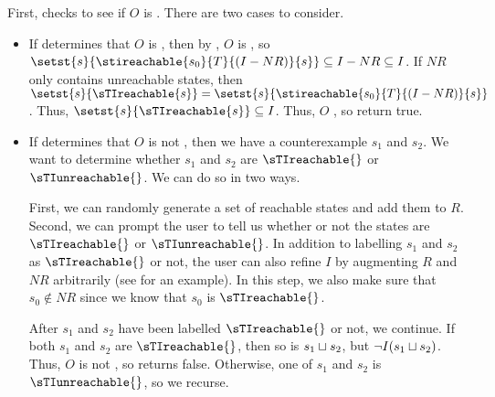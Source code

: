 First, \Helper{} checks to see if $O$ is . There are two
cases to consider.
\begin{itemize}
  \item
    If \IsIclosed{} determines that $O$ is , then by
    , $O$ is , so
    $
      \setst{s}{\stireachable{s_0}{T}{(I-NR)}{s}}
        \subseteq I - NR
        \subseteq I
    $.
    If $NR$ only contains unreachable states, then
    $
      \setst{s}{\sTIreachable{s}} = \setst{s}{\stireachable{s_0}{T}{(I-NR)}{s}}
    $.
    Thus,
    $
      \setst{s}{\sTIreachable{s}} \subseteq I
    $.
    Thus, $O$ \sTIconfluent{}, so \Helper{} return true.

  \item
    If \IsIclosed{} determines that $O$ is not , then we
    have a counterexample $s_1$ and $s_2$. We want to determine whether $s_1$
    and $s_2$ are $\sTIreachable{}$ or $\sTIunreachable{}$. We can do so in two
    ways.

    First, we can randomly generate a set of reachable states and add them to
    $R$.
    Second, we can prompt the user to tell us whether or not the states are
    $\sTIreachable{}$ or $\sTIunreachable{}$. In addition to labelling $s_1$
    and $s_2$ as $\sTIreachable{}$ or not, the user can also refine $I$ by
    augmenting $R$ and $NR$ arbitrarily (see 
    for an example). In this step, we also make sure that $s_0 \notin NR$ since
    we know that $s_0$ is $\sTIreachable{}$.

    After $s_1$ and $s_2$ have been labelled $\sTIreachable{}$ or not, we
    continue. If both $s_1$ and $s_2$ are $\sTIreachable{}$, then so is $s_1
    \sqcup s_2$, but $\lnot I(s_1 \sqcup s_2)$. Thus, $O$ is not \sTIconfluent{},
    so \Helper{} returns false. Otherwise, one of $s_1$ and $s_2$ is
    $\sTIunreachable{}$, so we recurse.
\end{itemize}


